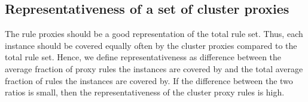 \documentclass[
  oneside]{book}
\begin{document}
\hypertarget{representativeness-of-a-set-of-cluster-proxies}{%
\subsection{Representativeness of a set of cluster proxies}\label{representativeness-of-a-set-of-cluster-proxies}}

The rule proxies should be a good representation of the total rule set.
Thus, each instance should be covered equally often by the cluster proxies compared to the total rule set.
Hence, we define representativeness as difference between the average fraction of proxy rules the instances are covered by and the total average fraction of rules the instances are covered by.
If the difference between the two ratios is small, then the representativeness of the cluster proxy rules is high.
\end{document}
